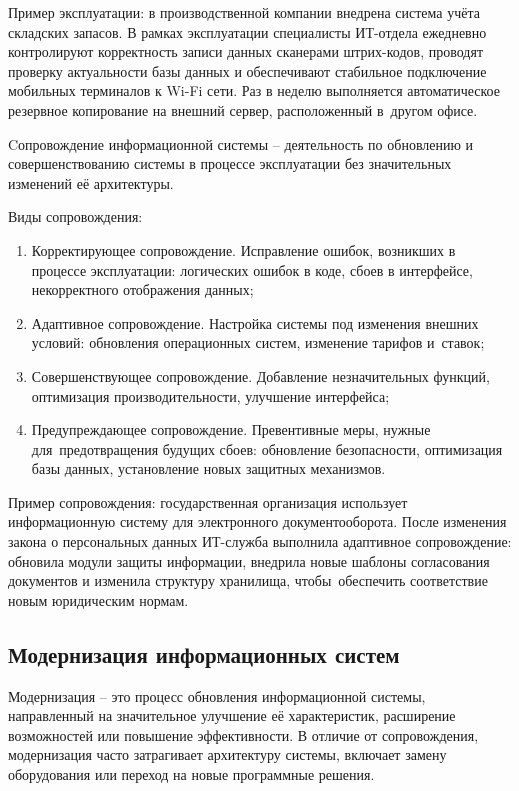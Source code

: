 \documentclass{ou}
\begin{document}
Пример эксплуатации: в производственной компании внедрена система учёта складских запасов. В рамках эксплуатации специалисты ИТ-отдела ежедневно контролируют корректность записи данных сканерами штрих-кодов, проводят проверку актуальности базы данных и обеспечивают стабильное подключение мобильных терминалов к Wi-Fi сети. Раз в неделю выполняется автоматическое резервное копирование на внешний сервер, расположенный в~другом офисе.

Cопровождение информационной системы -- деятельность по обновлению и совершенствованию системы в процессе эксплуатации без значительных изменений её архитектуры.

Виды сопровождения:
\begin{enumerate}[leftmargin=0em, itemindent=3.75em, nosep, label=\arabic*)]
\item Корректирующее сопровождение. Исправление ошибок, возникших в процессе эксплуатации: логических ошибок в коде, сбоев в интерфейсе, некорректного отображения данных;
\item Адаптивное сопровождение. Настройка системы под изменения внешних условий: обновления операционных систем, изменение тарифов и~ставок;
\item Совершенствующее сопровождение. Добавление незначительных функций, оптимизация производительности, улучшение интерфейса;
\item Предупреждающее сопровождение. Превентивные меры, нужные для~предотвращения будущих сбоев: обновление безопасности, оптимизация базы данных, установление новых защитных механизмов.
\end{enumerate}

Пример сопровождения: государственная организация использует информационную систему для электронного документооборота. После изменения закона о персональных данных ИТ-служба выполнила адаптивное сопровождение: обновила модули защиты информации, внедрила новые шаблоны согласования документов и изменила структуру хранилища, чтобы~обеспечить соответствие новым юридическим нормам.
\subsection{Модернизация информационных систем}
Модернизация -- это процесс обновления информационной системы, направленный на значительное улучшение её характеристик, расширение возможностей или повышение эффективности. В отличие от сопровождения, модернизация часто затрагивает архитектуру системы, включает замену оборудования или переход на новые программные решения.
\end{document}
